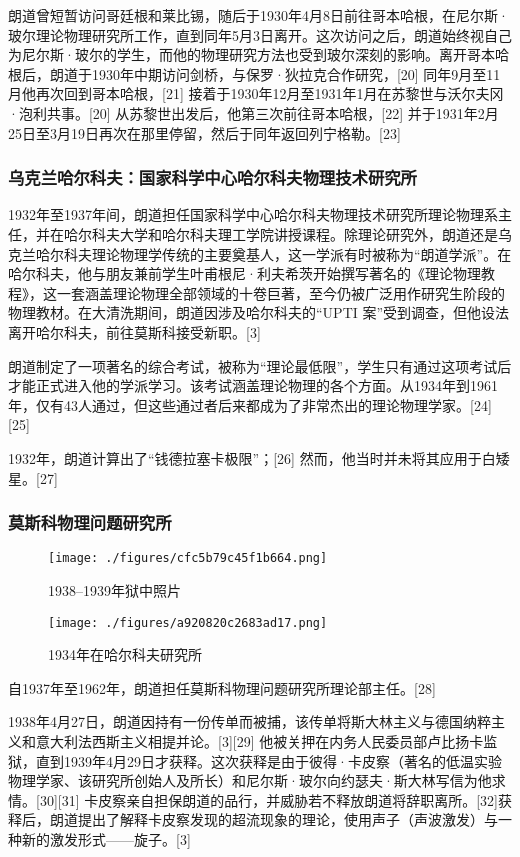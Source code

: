 朗道曾短暂访问哥廷根和莱比锡，随后于1930年4月8日前往哥本哈根，在尼尔斯·玻尔理论物理研究所工作，直到同年5月3日离开。这次访问之后，朗道始终视自己为尼尔斯·玻尔的学生，而他的物理研究方法也受到玻尔深刻的影响。离开哥本哈根后，朗道于1930年中期访问剑桥，与保罗·狄拉克合作研究，[20] 同年9月至11月他再次回到哥本哈根，[21] 接着于1930年12月至1931年1月在苏黎世与沃尔夫冈·泡利共事。[20] 从苏黎世出发后，他第三次前往哥本哈根，[22] 并于1931年2月25日至3月19日再次在那里停留，然后于同年返回列宁格勒。[23]
\subsubsection{乌克兰哈尔科夫：国家科学中心哈尔科夫物理技术研究所}
1932年至1937年间，朗道担任国家科学中心哈尔科夫物理技术研究所理论物理系主任，并在哈尔科夫大学和哈尔科夫理工学院讲授课程。除理论研究外，朗道还是乌克兰哈尔科夫理论物理学传统的主要奠基人，这一学派有时被称为“朗道学派”。在哈尔科夫，他与朋友兼前学生叶甫根尼·利夫希茨开始撰写著名的《理论物理教程》，这一套涵盖理论物理全部领域的十卷巨著，至今仍被广泛用作研究生阶段的物理教材。在大清洗期间，朗道因涉及哈尔科夫的“UPTI 案”受到调查，但他设法离开哈尔科夫，前往莫斯科接受新职。[3]

朗道制定了一项著名的综合考试，被称为“理论最低限”，学生只有通过这项考试后才能正式进入他的学派学习。该考试涵盖理论物理的各个方面。从1934年到1961年，仅有43人通过，但这些通过者后来都成为了非常杰出的理论物理学家。[24][25]

1932年，朗道计算出了“钱德拉塞卡极限”；[26] 然而，他当时并未将其应用于白矮星。[27]
\subsubsection{莫斯科物理问题研究所}
\begin{figure}[ht]
\centering
\texttt{[image: ./figures/cfc5b79c45f1b664.png]}
\caption{1938–1939年狱中照片} \label{fig_LFLD_3}
\end{figure}
\begin{figure}[ht]
\centering
\texttt{[image: ./figures/a920820c2683ad17.png]}
\caption{1934年在哈尔科夫研究所} \label{fig_LFLD_4}
\end{figure}
自1937年至1962年，朗道担任莫斯科物理问题研究所理论部主任。[28]

1938年4月27日，朗道因持有一份传单而被捕，该传单将斯大林主义与德国纳粹主义和意大利法西斯主义相提并论。[3][29] 他被关押在内务人民委员部卢比扬卡监狱，直到1939年4月29日才获释。这次获释是由于彼得·卡皮察（著名的低温实验物理学家、该研究所创始人及所长）和尼尔斯·玻尔向约瑟夫·斯大林写信为他求情。[30][31] 卡皮察亲自担保朗道的品行，并威胁若不释放朗道将辞职离所。[32]获释后，朗道提出了解释卡皮察发现的超流现象的理论，使用声子（声波激发）与一种新的激发形式——旋子。[3]

